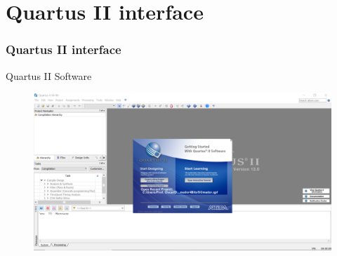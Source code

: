 \documentclass{CPSPresentation}
\begin{document}
\section{Quartus II interface}
\begin{frame}
	\frametitle{Quartus II interface}
	
	\begin{block}{}
		\justifying
		Quartus II Software
	\end{block}
	
	
	
	\begin{figure}[h]
		\centering
		\includegraphics[width=1.01\textwidth]{quartus/fig02.pdf}
	\end{figure}
	
	
\end{frame}
\end{document}
